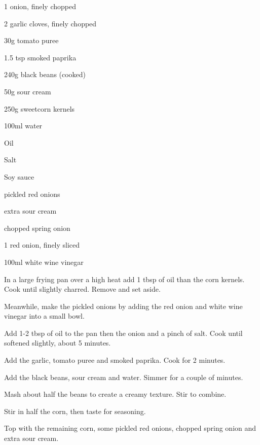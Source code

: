 \label{recipe:creamy_smoky_black_beans}


\begin{ingredients}

  \item 1 onion, finely chopped
  \item 2 garlic cloves, finely chopped
  \item 30g tomato puree
  \item 1.5 tsp smoked paprika
  \item 240g black beans (cooked)
  \item 50g sour cream
  \item 250g sweetcorn kernels
  \item 100ml water
  \item Oil
  \item Salt
  \item Soy sauce
  \item pickled red onions
  \item extra sour cream
  \item chopped spring onion
  \item 1 red onion, finely sliced
  \item 100ml white wine vinegar
\end{ingredients}


\begin{method}
In a large frying pan over a high heat add 1 tbsp of oil than the corn
kernels. Cook until slightly charred. Remove and set aside.

Meanwhile, make the pickled onions by adding the red onion and
white wine vinegar into a small bowl.

Add 1-2 tbsp of oil to the pan then the onion and a pinch of salt. Cook
until softened slightly, about 5 minutes.

Add the garlic, tomato puree and smoked paprika. Cook for 2
minutes.

Add the black beans, sour cream and water. Simmer for a couple of
minutes.

Mash about half the beans to create a creamy texture. Stir to combine.

Stir in half the corn, then taste for seasoning.

Top with the remaining corn, some pickled red onions, chopped
spring onion and extra sour cream. 
  
\end{method}


